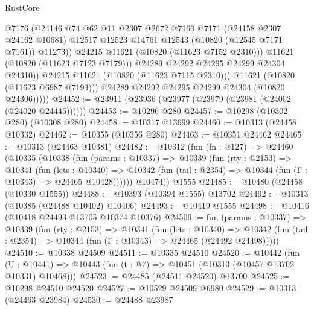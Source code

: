 \begin{lexlean}{RustCore}
\begin{coremodule}
                          @7176
                          (@24146
                            @74
                            @62
                            @11
                            @2307
                            @2672
                            @7160
                            @7171
                            (@24158 @2307 @24162 @10681)
                            @12517
                            @12523
                            @14761
                            @12543
                            (@10820 (@12545 @7171 @7161))
                            @11273))
                        @24215
                        @11621
                        (@10820 (@11623 @7152 @2310)))
                      @11621
                      (@10820 (@11623 @7123 @7179)))
                    @24289
                    @24292
                    @24295
                    @24299
                    @24304
                    @24310))
                @24215
                @11621
                (@10820 (@11623 @7115 @2310)))
              @11621
              (@10820 (@11623 @6987 @7194)))
            @24289
            @24292
            @24295
            @24299
            @24304
            (@10820 @24306)))))
@24452 := @23911 (@23936 (@23977 (@23979 (@23981 (@24002 (@24020 @24445))))))
@24453 := @10296 @280
@24457 := @10298 (@10302 @280) (@10308 @280)
@24458 := @10317 @13699
@24460 := @10313 (@24458 @10332)
@24462 := @10355 (@10356 @280)
@24463 := @10351 @24462
@24465 := @10313 (@24463 @10381)
@24482 := @10312
    (fun (fn : @127) =>
    @24460
      (@10335
        (@10338
          (fun (params : @10337) =>
          @10339
            (fun (rty : @2153) =>
            @10341
              (fun (lets : @10340) =>
              @10342 (fun (tail : @2354) => @10344 (fun (Γ : @10343) => @24465 @10428))))))
        @10474))
    @1555
@24485 := @10480 (@24458 (@10330 @1555))
@24488 := @10393 (@10394 @1555) @13702
@24492 := @10313 (@10385 (@24488 @10402) @10406)
@24493 := @10419 @1555
@24498 := @10416 (@10418 @24493 @13705 @10374 @10376)
@24509 := fun (params : @10337) =>
  @10339
    (fun (rty : @2153) =>
    @10341
      (fun (lets : @10340) =>
      @10342 (fun (tail : @2354) => @10344 (fun (Γ : @10343) => @24465 (@24492 @24498)))))
@24510 := @10338 @24509
@24511 := @10335 @24510
@24520 := @10442
    (fun (U : @10441) => @10443 (fun (t : @7) => @10451 (@10313 (@10457 @13702 @10331) @10468)))
@24523 := @24485 (@24511 @24520) @13700
@24525 := @10298 @24510 @24520
@24527 := @10529 @24509 @6980
@24529 := @10313 (@24463 @23984)
@24530 := @24488 @23987

\end{coremodule}
\end{lexlean}
